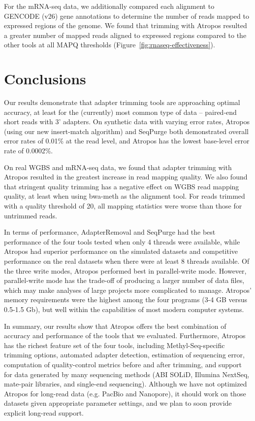\documentclass[fleqn,10pt,lineno]{wlpeerj} %
\begin{document}
For the mRNA-seq data, we additionally compared each alignment to GENCODE (v26) gene annotations \citep{harrow_gencode:_2012} to determine the number of reads mapped to expressed regions of the genome. We found that trimming with Atropos resulted a greater number of mapped reads aligned to expressed regions compared to the other tools at all MAPQ thresholds (Figure~\ref{fig:rnaseq-effectiveness}).

\section{Conclusions}

Our results demonstrate that adapter trimming tools are approaching optimal accuracy, at least for the (currently) most common type of data -- paired-end short reads with 3' adapters. On synthetic data with varying error rates, Atropos (using our new insert-match algorithm) and SeqPurge both demonstrated overall error rates of 0.01\% at the read level, and Atropos has the lowest base-level error rate of 0.0002\%. 

On real WGBS and mRNA-seq data, we found that adapter trimming with Atropos resulted in the greatest increase in read mapping quality. We also found that stringent quality trimming has a negative effect on WGBS read mapping quality, at least when using bwa-meth as the alignment tool. For reads trimmed with a quality threshold of 20, all mapping statistics were worse than those for untrimmed reads.

In terms of performance, AdapterRemoval and SeqPurge had the best performance of the four tools tested when only 4 threads were available, while Atropos had superior performance on the simulated datasets and competitive performance on the real datasets when there were at least 8 threads available. Of the three write modes, Atropos performed best in parallel-write mode. However, parallel-write mode has the trade-off of producing a larger number of data files, which may make analyses of large projects more complicated to manage. Atropos' memory requirements were the highest among the four programs (3-4 GB versus 0.5-1.5 Gb), but well within the capabilities of most modern computer systems.

In summary, our results show that Atropos offers the best combination of accuracy and performance of the tools that we evaluated. Furthermore, Atropos has the richest feature set of the four tools, including Methyl-Seq-specific trimming options, automated adapter detection, estimation of sequencing error, computation of quality-control metrics before and after trimming, and support for data generated by many sequencing methods (ABI SOLiD, Illumina NextSeq, mate-pair libraries, and single-end sequencing). Although we have not optimized Atropos for long-read data (e.g. PacBio and Nanopore), it should work on those datasets given appropriate parameter settings, and we plan to soon provide explicit long-read support.
\end{document}
